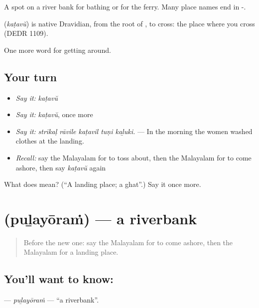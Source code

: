 A spot on a river bank for bathing or for the ferry. Many place names end in -.

\begin{cousinweb}
\textbf{} (\emph{kaṭavŭ}) is native Dravidian, from the root of , to cross: the place where you cross (DEDR 1109).
\end{cousinweb}

\begin{grammarlens}[title={What you've built}]
One more word for getting around.
\end{grammarlens}

\subsection*{Your turn}
\begin{itemize}
\raggedright
  \item \emph{Say it:} \emph{kaṭavŭ}
  \item \emph{Say it:} \emph{kaṭavŭ}, once more
  \item \emph{Say it:} \emph{strīkaḷ rāvile kaṭavil tuṇi kaḻuki.} — In the morning the women washed clothes at the landing.
  \item \emph{Recall:} say the Malayalam for to toss about, then the Malayalam for to come ashore, then say \emph{kaṭavŭ} again
\end{itemize}

\begin{tcolorbox}[breakable,colback=teal!4,colframe=teal!35!black,title={Before you move on}]
What does  mean? (\textquotedblleft{}A landing place; a ghat\textquotedblright{}.) Say it once more.
\end{tcolorbox}
\section[\texorpdfstring{\ml{പുഴയോരം} (puḻayōraṁ)}{പുഴയോരം (puḻayōraṁ)}]{ (puḻayōraṁ) — a riverbank}

\label{lesson:ML-C477-pulayoram}



\begin{quote}
Before the new one: say the Malayalam for to come ashore, then the Malayalam for a landing place.
\end{quote}

\subsection*{You'll want to know: }
\textbf{} — \emph{puḻayōraṁ} — \textquotedblleft{}a riverbank\textquotedblright{}.

